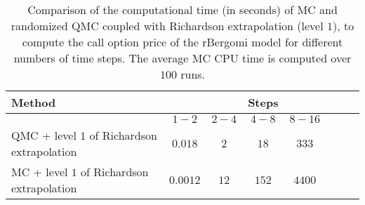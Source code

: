 \begin{table}[h!]
	\centering
	\begin{tabular}{l*{6}{c}r}
		\toprule[1.5pt]
		Method & &   & Steps & &     \\
		\hline
		& $1-2$ & $2-4$ & $4-8$ & $8-16$   \\
		\hline	
		QMC + level $1$ of  Richardson extrapolation  &$0.018$ & $2$  & $18$  & $333$   \\
		\hline	
		MC + level $1$ of  Richardson extrapolation &$
		0.0012$ & $12$  & $152$  & $4400$ \\
		\bottomrule[1.25pt]
	\end{tabular}
	\caption{Comparison of the computational time (in seconds) of  MC and randomized QMC coupled with Richardson extrapolation (level $1$), to compute the call option price of the rBergomi model for different numbers of time steps. The average MC CPU time is computed over $100$ runs.}
	\label{Comparsion of the computational time of  MC and MISC, using Richardson extrapolation (level $1$), used to compute Call option price of rBergomi model for different number of time steps. Case set $2$ parameters,linear}
\end{table}

\FloatBarrier

%
%		
%		




